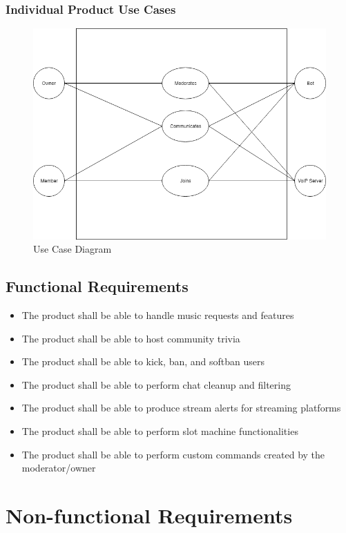 \documentclass[12pt, titlepage]{article}
\begin{document}
\subsubsection{Individual Product Use Cases}
\begin{figure}
   \centering
   \includegraphics[width=\linewidth]{UseCaseDiagram.png}
   \caption{Use Case Diagram}
  \label{fig:use Case Diagram}
\end{figure}

\subsection{Functional Requirements}
\begin{itemize}
\item The product shall be able to handle music requests and features
\item The product shall be able to host community trivia
\item The product shall be able to kick, ban, and softban users
\item The product shall be able to perform chat cleanup and filtering
\item The product shall be able to produce stream alerts for streaming platforms
\item The product shall be able to perform slot machine functionalities
\item The product shall be able to perform custom commands created by the moderator/owner
\end{itemize}


\section{Non-functional Requirements}
\end{document}
